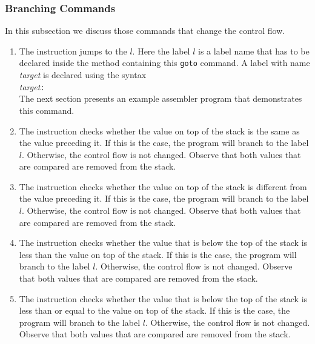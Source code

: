 \subsubsection{Branching Commands}
In this subsection we discuss those commands that change the control flow.
\begin{enumerate}
\item The instruction 
      jumps to the  $l$.  Here the label $l$ is a label name that has to be declared inside the
      method containing this \texttt{goto} command.  A label with name \textsl{target} is declared using the syntax
      \\[0.2cm]
      \hspace*{1.3cm}
      \textsl{target}\texttt{:}
      \\[0.2cm]
      The next section presents an example assembler program that demonstrates this command.
\item The instruction 
      checks whether the value on top of the stack is the same as the value preceding it.  If this is
      the case, the program will branch 
      to the label $l$.  Otherwise, the control flow is not changed.  Observe that both values that are
      compared are removed from the stack.
\item The instruction 
      checks whether the value on top of the stack is different from the value preceding it.  If this is
      the case, the program will branch to the label $l$.  Otherwise, the control flow is not
      changed.  Observe that both values that are compared are removed from the stack.

\item The instruction 
      checks whether the value that is below the top of the stack is less than the value on top of
      the stack.  If this is the case, the program will branch 
      to the label $l$.  Otherwise, the control flow is not changed.  Observe that both values that are
      compared are removed from the stack.

\item The instruction 
      checks whether the value that is below the top of the stack is less than or equal to the value on top
      of the stack.  If this is the case, the program will branch 
      to the label $l$.  Otherwise, the control flow is not changed.  Observe that both values that are
      compared are removed from the stack.
      

\end{enumerate}
